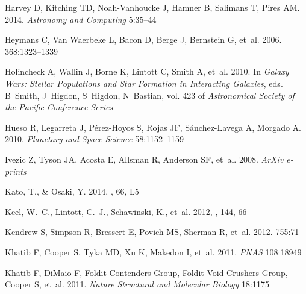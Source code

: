 \documentclass{ar2e}
\begin{document}
\begin{thebibliography}{}
{Harvey} D, {Kitching} TD, {Noah-Vanhoucke} J, {Hamner} B, {Salimans} T,
  {Pires} AM. 2014.
\newblock \textit{Astronomy and Computing} 5:35--44

{Heymans} C, {Van Waerbeke} L, {Bacon} D, {Berge} J, {Bernstein} G, et~al.
  2006.
\newblock \textit{\mnras} 368:1323--1339

{Holincheck} A, {Wallin} J, {Borne} K, {Lintott} C, {Smith} A, et~al. 2010.
\newblock In \textit{Galaxy Wars: Stellar Populations and Star Formation in
  Interacting Galaxies}, eds. B~{Smith}, J~{Higdon}, S~{Higdon}, N~{Bastian},
  vol. 423 of \textit{Astronomical Society of the Pacific Conference Series}

{Hueso} R, {Legarreta} J, {P{\'e}rez-Hoyos} S, {Rojas} JF, {S{\'a}nchez-Lavega}
  A, {Morgado} A. 2010.
\newblock \textit{Planetary and Space Science} 58:1152--1159

{Ivezic} Z, {Tyson} JA, {Acosta} E, {Allsman} R, {Anderson} SF, et~al. 2008.
\newblock \textit{ArXiv e-prints}

{Kato}, T., \& {Osaki}, Y. 2014, \pasj, 66, L5

{Keel}, W.~C., {Lintott}, C.~J., {Schawinski}, K., {et~al.} 2012, \aj, 144, 66

{Kendrew} S, {Simpson} R, {Bressert} E, {Povich} MS, {Sherman} R, et~al. 2012.
\newblock \textit{\apj} 755:71

{Khatib} F, {Cooper} S, {Tyka} MD, {Xu} K, {Makedon} I, et~al.
  2011{}.
\newblock \textit{{PNAS}} 108:18949

{Khatib} F, {DiMaio} F, {Foldit Contenders Group}, {Foldit Void Crushers
  Group}, {Cooper} S, et~al. 2011{}.
\newblock \textit{{Nature Structural and Molecular Biology}} 18:1175


\end{thebibliography}
\end{document}
